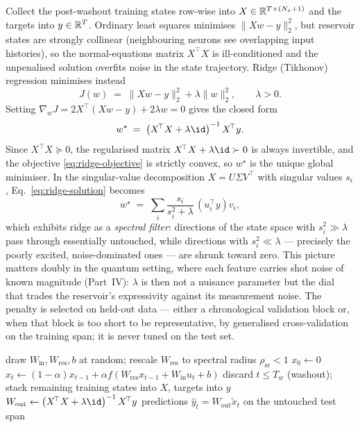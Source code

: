 Collect the post-washout training states row-wise into
$X \in \mathbb{R}^{T\times (N_x+1)}$ and the targets into $y \in \mathbb{R}^{T}$. Ordinary
least squares minimises $\lVert Xw - y\rVert_2^2$, but reservoir states are
strongly collinear (neighbouring neurons see overlapping input histories), so
the normal-equations matrix $X^{\!\top}X$ is ill-conditioned and the unpenalised
solution overfits noise in the state trajectory. Ridge (Tikhonov) regression
minimises instead
\begin{equation}
  J(w) \;=\; \lVert Xw - y\rVert_2^2 + \lambda \lVert w\rVert_2^2,
  \qquad \lambda > 0 .
  \label{eq:ridge-objective}
\end{equation}
Setting $\nabla_w J = 2X^{\!\top}(Xw-y) + 2\lambda w = 0$ gives the closed form
\begin{equation}
  w^\star \;=\; \left(X^{\!\top}X + \lambda \id\right)^{-1} X^{\!\top} y .
  \label{eq:ridge-solution}
\end{equation}
Since $X^{\!\top}X \succeq 0$, the regularised matrix
$X^{\!\top}X + \lambda\id \succ 0$ is always invertible, and the objective
\eqref{eq:ridge-objective} is strictly convex, so $w^\star$ is the unique global
minimiser. In the singular-value decomposition $X = U\Sigma V^{\!\top}$ with
singular values $s_i$, Eq.~\eqref{eq:ridge-solution} becomes
\begin{equation}
  w^\star \;=\; \sum_i \frac{s_i}{s_i^2 + \lambda}\, \left(u_i^{\!\top} y\right) v_i ,
  \label{eq:ridge-svd}
\end{equation}
which exhibits ridge as a \emph{spectral filter}: directions of the state
space with $s_i^2 \gg \lambda$ pass through essentially untouched, while
directions with $s_i^2 \ll \lambda$ --- precisely the poorly excited, noise-dominated
ones --- are shrunk toward zero. This picture matters doubly in the quantum
setting, where each feature carries shot noise of known magnitude
(Part~IV): $\lambda$ is then not a nuisance parameter but the dial that trades
the reservoir's expressivity against its measurement noise. The penalty is
selected on held-out data --- either a chronological validation block or, when
that block is too short to be representative, by generalised cross-validation
on the training span; it is never tuned on the test set.

\begin{algorithm*}[t]
\caption{Echo state network training (batch, ridge read-out)}
\label{alg:esn}
\begin{algorithmic}[1]
\State draw $W_{\mathrm{in}}, W_{\mathrm{res}}, b$ at random; rescale $W_{\mathrm{res}}$ to spectral radius $\rho_{\mathrm{sr}}<1$
\State $x_0 \gets 0$
  \State $x_t \gets (1-\alpha)x_{t-1} + \alpha f(W_{\mathrm{res}}x_{t-1} + W_{\mathrm{in}}u_t + b)$
\EndFor
\State discard $t \le T_w$ (washout); stack remaining training states into $X$, targets into $y$
\State $W_{\mathrm{out}} \gets \left(X^{\!\top}X + \lambda\id\right)^{-1}X^{\!\top}y$ 
\State \Return predictions $\hat y_t = W_{\mathrm{out}}\tilde x_t$ on the untouched test span
\end{algorithmic}
\end{algorithm*}

